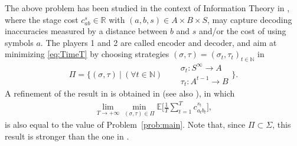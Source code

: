 \documentclass[smallextended,referee,envcountsect,]{svjour3}
\newcommand{\NN}{{\mathbb N}}
\newcommand{\R}{{\mathbb R}}
\newcommand{\E}{{\mathbb E}}
\newcommand{\Menge}[2]{\bigg\{{#1}~\bigg|~{#2}\bigg\}}
\begin{document}
The above problem has been studied in the context of Information 
Theory in \cite{Cuff(ImplicitCoordination)11}, where the stage cost 
$c_{ab}^s\in\R$ with $(a,b,s)\in A\times B\times S$, may capture 
decoding inaccuracies  measured by a distance between $b$ and 
$s$ and/or the cost of using symbols $a$. The players 1 and 2 are 
called encoder and decoder, and aim at minimizing 
\eqref{eq:TimeT} by choosing strategies 
$(\sigma,\tau)=(\sigma_t,\tau_t)_{t\in\NN}$  in 
\begin{equation}
\label{e:stratC}
\Pi=\Menge{(\sigma,\tau)}{(\forall t\in\NN)\quad 
\begin{aligned}
&\sigma_t : S^{\infty}  \to A\\[-2pt]
&\tau_t :  A^{t-1}\to B
\end{aligned}
}.
\end{equation}
A refinement of the result in 
\cite{GossnerHernandezNeyman06} is obtained in 
\cite{Cuff(ImplicitCoordination)11}
(see also \cite[Theorem~2]{LeTreust(EmpiricalCoordination)17}), in which 
\begin{align}
\lim_{T \rightarrow + \infty} \min_{(\sigma, \tau)\in\Pi} \E\bigg[\frac{1}{T} \sum_{t=1}^T 
c_{a_tb_t}^{s_t}\bigg], 
\label{eq:AsymptoticC}
\end{align} 
is also equal to the value of Problem~\ref{prob:main}. Note that, since $\Pi\subset\Sigma$, 
this result is stronger than the one in \cite{GossnerHernandezNeyman06}.
\end{document}

